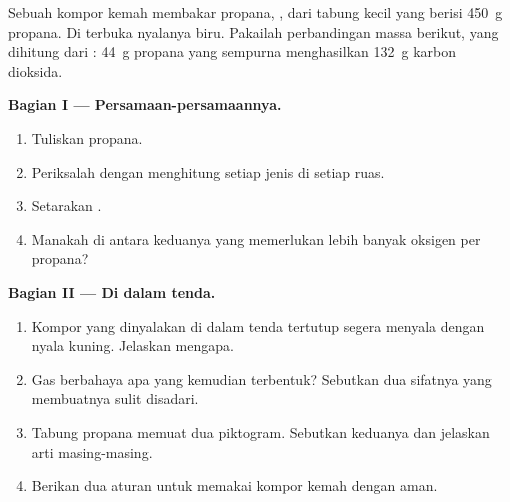 \begin{problem}
\label{pb:g8:combustion-and-fuels:1}
Sebuah kompor kemah membakar propana, , dari tabung kecil yang
berisi \qty{450}{g} propana. Di  terbuka nyalanya biru. Pakailah
perbandingan massa berikut, yang dihitung dari :
\qty{44}{g} propana yang  sempurna menghasilkan \qty{132}{g}
karbon dioksida.

\medskip
\noindent\textbf{Bagian I --- Persamaan-persamaannya.}
\begin{enumerate}
  \item Tuliskan   propana.
  \item Periksalah dengan menghitung  setiap jenis di setiap ruas.
  \item Setarakan 
        . %
  \item Manakah di antara keduanya yang memerlukan lebih banyak oksigen
        per  propana?
\end{enumerate}

\medskip
\noindent\textbf{Bagian II --- Di dalam tenda.}
\begin{enumerate}[resume]
  \item Kompor yang dinyalakan di dalam tenda tertutup segera menyala
        dengan nyala kuning. Jelaskan mengapa.
  \item Gas berbahaya apa yang kemudian terbentuk? Sebutkan dua sifatnya
        yang membuatnya sulit disadari.
  \item Tabung propana memuat dua piktogram. Sebutkan keduanya dan
        jelaskan arti masing-masing.
  \item Berikan dua aturan untuk memakai kompor kemah dengan aman.
\end{enumerate}


\end{problem}
